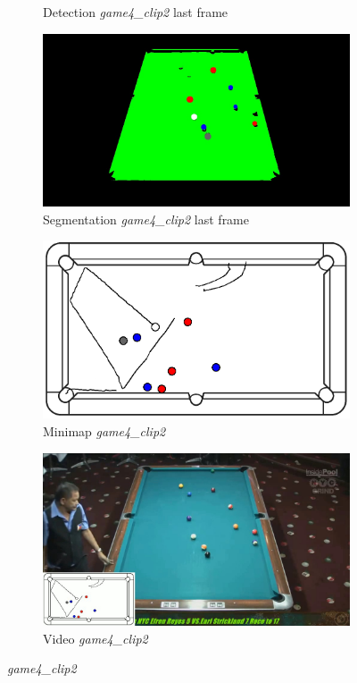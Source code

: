 \begin{figure}[H]
\begin{subfigure}[b]{0.48\textwidth}
		\caption{Detection \textit{game4\_clip2} last frame}
		\label{fig: game4_clip2_last_frame_detected}
	\end{subfigure}
	\begin{subfigure}[b]{0.48\textwidth}
		\centering
		\includegraphics[width=\textwidth]{images/Segmentation/game4_clip2_segmented_balls_last_frame.jpg}
		\caption{Segmentation \textit{game4\_clip2} last frame}
		\label{fig: game4_clip2_last_frame_segmented}
	\end{subfigure}
	\begin{subfigure}[b]{0.48\textwidth}
		\centering
		\includegraphics[width=\textwidth]{images/AllMinimap/game4_clip2_minimap.png}
		\caption{Minimap \textit{game4\_clip2}}
		\label{fig: game4_clip2_minimap}
	\end{subfigure}
	\begin{subfigure}[b]{0.48\textwidth}
		\centering
		\includegraphics[width=\textwidth]{images/Video/game4_clip2_video.jpg}
		\caption{Video \textit{game4\_clip2}}
		\label{fig: game4_clip2_video}
	\end{subfigure}

	\caption{\textit{game4\_clip2}}
\end{figure}
